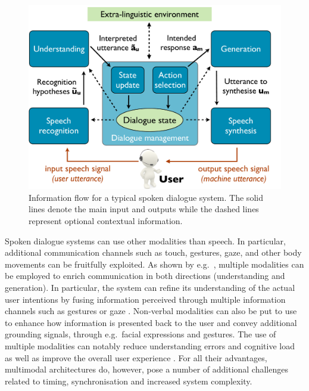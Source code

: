  \begin{figure}[ht]
\centering
\vspace{5mm}
\includegraphics[scale=0.30]{imgs/architecture.pdf}
\vspace{5mm}
\caption{Information flow for a typical spoken dialogue system. The solid lines denote the main input and outputs while the dashed lines represent optional contextual information.}
\label{fig:architecture}
\end{figure}

Spoken dialogue systems can use other modalities than speech.  In particular, additional communication channels such as touch, gestures, gaze, and other body movements can be fruitfully exploited.  As shown by e.g.\ \cite{smartkom}, multiple modalities can be employed to enrich communication in both directions (understanding and generation). In particular, the system can refine its understanding of the actual user intentions by fusing information perceived through multiple information channels such as gestures \citep{stiefelhagen2004} or gaze \citep{koller2012}.  Non-verbal modalities can also be put to use to enhance how information is presented back to the user and convey additional grounding signals, through e.g.\ facial expressions and gestures. The use of multiple modalities can notably reduce understanding errors and cognitive load \citep{oviatt2004we} as well as improve the overall user experience \citep{JokinenH06}.  For all their advantages, multimodal architectures do, however, pose a number of additional challenges related to timing, synchronisation and increased system complexity. 

